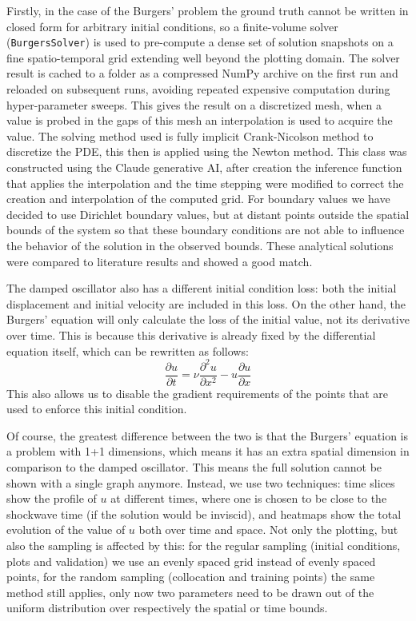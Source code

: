 \documentclass[12pt, a4paper]{report}
\newcommand{\pd}[2]{\frac{\partial #1}{\partial #2}}
\newcommand{\pdd}[2]{\frac{\partial^2 #1}{\partial #2^2}}
\begin{document}
Firstly, in the case of the Burgers' problem the ground truth cannot be written in closed form for arbitrary initial conditions, so a finite-volume solver (\verb|BurgersSolver|) is used to pre-compute a dense set of solution snapshots on a fine spatio-temporal grid extending well beyond the plotting domain. The solver result is cached to a folder as a compressed NumPy archive on the first run and reloaded on subsequent runs, avoiding repeated expensive computation during hyper-parameter sweeps. This gives the result on a discretized mesh, when a value is probed in the gaps of this mesh an interpolation is used to acquire the value. The solving method used is fully implicit Crank-Nicolson method to discretize the PDE, this then is applied using the Newton method. This class was constructed using the Claude generative AI, after creation the inference function that applies the interpolation and the time stepping were modified to correct the creation and interpolation of the computed grid. For boundary values we have decided to use Dirichlet boundary values, but at distant points outside the spatial bounds of the system so that these boundary conditions are not able to influence the behavior of the solution in the observed bounds. These analytical solutions were compared to literature results and showed a good match.

The damped oscillator also has a different initial condition loss: both the initial displacement and initial velocity are included in this loss. On the other hand, the Burgers' equation will only calculate the loss of the initial value, not its derivative over time. This is because this derivative is already fixed by the differential equation itself, which can be rewritten as follows:
\[
\pd{u}{t} = \nu \pdd{u}{x} - u\pd{u}{x}
\]
This also allows us to disable the gradient requirements of the points that are used to enforce this initial condition.

Of course, the greatest difference between the two is that the Burgers' equation is a problem with 1+1 dimensions, which means it has an extra spatial dimension in comparison to the damped oscillator. This means the full solution cannot be shown with a single graph anymore. Instead, we use two techniques: time slices show the profile of $u$ at different times, where one is chosen to be close to the shockwave time (if the solution would be inviscid), and heatmaps show the total evolution of the value of $u$ both over time and space. Not only the plotting, but also the sampling is affected by this: for the regular sampling (initial conditions, plots and validation) we use an evenly spaced grid instead of evenly spaced points, for the random sampling (collocation and training points) the same method still applies, only now two parameters need to be drawn out of the uniform distribution over respectively the spatial or time bounds.
\end{document}
